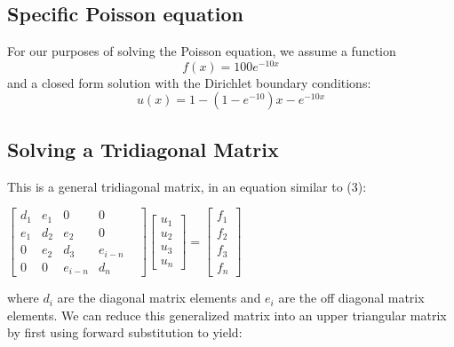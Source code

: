 \documentclass[10pt,showpacs,preprintnumbers,footinbib,amsmath,amssymb,aps,prl,twocolumn,groupedaddress,superscriptaddress,showkeys]{revtex4-1}
\begin{document}
	\subsection{Specific Poisson equation}	
For our purposes of solving the Poisson equation, we assume a function \begin{equation}
	f(x)=100e^{-10x}
	\end{equation}
and a closed form solution with the Dirichlet boundary conditions:
	\begin{equation}
	u(x)=1-(1-e^{-10})x-e^{-10x}
	\end{equation}

	\subsection{Solving a Tridiagonal Matrix}	
This is a general tridiagonal matrix, in an equation similar to (3): 
	\begin{center}
		$\begin{bmatrix}
			d_{1}& e_{1} & 0 & 0 \\
			e_{1} & d_{2} & e_{2} & 0 & \\
			0 & e_{2} & d_{3} & e_{i-n}   \\
			0 & 0 & e_{i-n} & d_{n} 
	
		\end{bmatrix}
		 \begin{bmatrix}
			u_{1} \\
			u_{2} \\
			u_{3} \\
			u_{n} 
		\end{bmatrix} =
		\begin{bmatrix}
			f_{1} \\
			f_{2} \\
			f_{3} \\
			f_{n}
		\end{bmatrix}$
		\end{center}

where $d_{i}$ are the diagonal matrix elements and $e_{i}$ are the off diagonal matrix elements. We can reduce this generalized matrix into an upper triangular matrix by first using forward substitution to yield:
	
\end{document}
